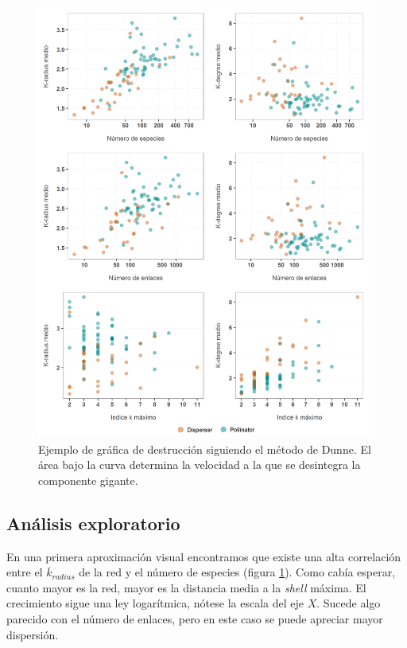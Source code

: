 \begin{figure}[hbp!]
\centering
\includegraphics[scale=0.18]{Figures/ESTATICA_tamanyo_kdegree_kradius.png}
\caption[PolarExample]{Ejemplo de gráfica de destrucción siguiendo el método de Dunne. El área bajo la curva determina la velocidad a la que se desintegra la componente gigante.}
\label{fig:ESTATICA_tamanyo_kdegree_kradius}
\end{figure}

\subsection{Análisis exploratorio}

En una primera aproximación visual encontramos que existe una alta correlación entre el $\overline{k}_{radius}$ de la red y el número de especies (figura \ref{fig:ESTATICA_tamanyo_kdegree_kradius}). Como cabía esperar, cuanto mayor es la red, mayor es la distancia media a la \textit{shell} máxima. El crecimiento sigue una ley logarítmica, nótese la escala del eje $X$. Sucede algo parecido con el número de enlaces, pero en este caso se puede apreciar mayor dispersión. 

